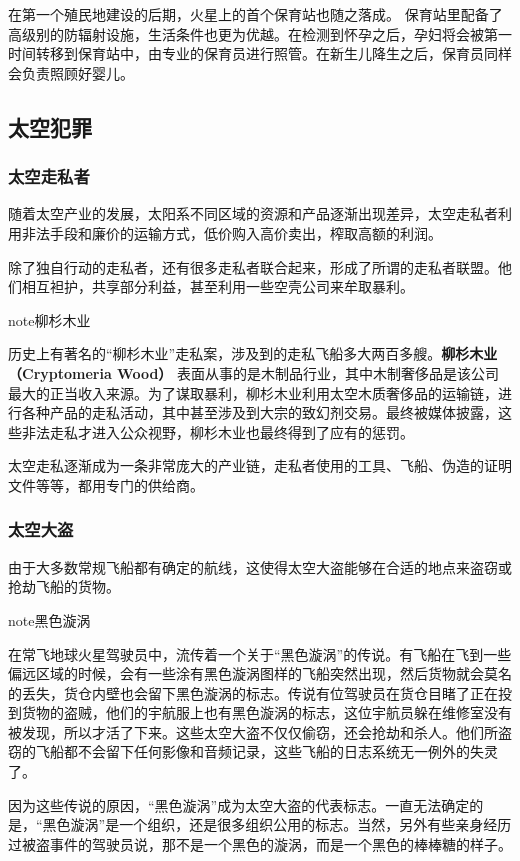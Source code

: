 \documentclass[letterpaper,10pt]{sphinxmanual}
\begin{document}
在第一个殖民地建设的后期，火星上的首个保育站也随之落成。
保育站里配备了高级别的防辐射设施，生活条件也更为优越。在检测到怀孕之后，孕妇将会被第一时间转移到保育站中，由专业的保育员进行照管。在新生儿降生之后，保育员同样会负责照顾好婴儿。


\subsection{太空犯罪}
\label{profession:id30}

\subsubsection{太空走私者}
\label{profession:id31}
随着太空产业的发展，太阳系不同区域的资源和产品逐渐出现差异，太空走私者利用非法手段和廉价的运输方式，低价购入高价卖出，榨取高额的利润。

除了独自行动的走私者，还有很多走私者联合起来，形成了所谓的走私者联盟。他们相互袒护，共享部分利益，甚至利用一些空壳公司来牟取暴利。

\begin{notice}{note}{柳杉木业}

历史上有著名的“柳杉木业”走私案，涉及到的走私飞船多大两百多艘。\textbf{柳杉木业（Cryptomeria Wood）} 表面从事的是木制品行业，其中木制奢侈品是该公司最大的正当收入来源。为了谋取暴利，柳杉木业利用太空木质奢侈品的运输链，进行各种产品的走私活动，其中甚至涉及到大宗的致幻剂交易。最终被媒体披露，这些非法走私才进入公众视野，柳杉木业也最终得到了应有的惩罚。
\end{notice}

太空走私逐渐成为一条非常庞大的产业链，走私者使用的工具、飞船、伪造的证明文件等等，都用专门的供给商。


\subsubsection{太空大盗}
\label{profession:id32}
由于大多数常规飞船都有确定的航线，这使得太空大盗能够在合适的地点来盗窃或抢劫飞船的货物。

\begin{notice}{note}{黑色漩涡}

在常飞地球火星驾驶员中，流传着一个关于“黑色漩涡”的传说。有飞船在飞到一些偏远区域的时候，会有一些涂有黑色漩涡图样的飞船突然出现，然后货物就会莫名的丢失，货仓内壁也会留下黑色漩涡的标志。传说有位驾驶员在货仓目睹了正在投到货物的盗贼，他们的宇航服上也有黑色漩涡的标志，这位宇航员躲在维修室没有被发现，所以才活了下来。这些太空大盗不仅仅偷窃，还会抢劫和杀人。他们所盗窃的飞船都不会留下任何影像和音频记录，这些飞船的日志系统无一例外的失灵了。

因为这些传说的原因，“黑色漩涡”成为太空大盗的代表标志。一直无法确定的是，“黑色漩涡”是一个组织，还是很多组织公用的标志。当然，另外有些亲身经历过被盗事件的驾驶员说，那不是一个黑色的漩涡，而是一个黑色的棒棒糖的样子。
\end{notice}
\end{document}
